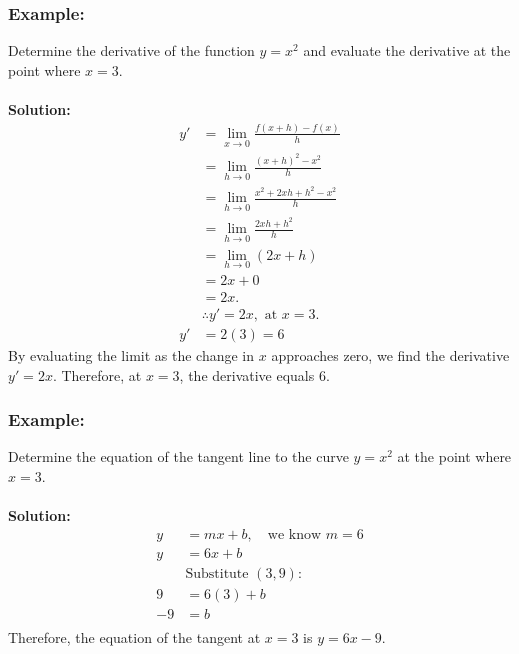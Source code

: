 \documentclass{article}
\begin{document}
\subsubsection*{Example:}
Determine the derivative of the function $y=x^2$ and evaluate the derivative at the point where $x=3$.\\ \\ 
\textbf{Solution:}
\begin{align*}
    y' &= \lim_{x \to 0} \frac{f(x+h)-f(x)}{h}\\
    &= \lim_{h \to 0} \frac{(x+h)^2-x^2}{h}\\
    &= \lim_{h \to 0} \frac{x^2+2xh+h^2-x^2}{h}\\
    &= \lim_{h \to 0} \frac{2xh+h^2}{h}\\
    &= \lim_{h \to 0} (2x+h)\\
    &= 2x + 0\\
    &= 2x.\\
    & \therefore y'=2x, \text{ at } x=3. \\
    y' &=2(3)=6 
\end{align*}
By evaluating the limit as the change in \( x \) approaches zero, we find the derivative \( y' = 2x \). Therefore, at \( x = 3 \), the derivative equals 6.
\newpage
\subsubsection*{Example:}
Determine the equation of the tangent line to the curve $y=x^2$ at the point where $x=3$. \\ \\ 
\textbf{Solution:}
\begin{align*}
    y &= mx + b, \quad \text{we know } m = 6 \\
    y &= 6x + b \\
    & \text{Substitute }(3, 9): \\
    9 &= 6(3) + b \\
    -9 &= b \\
\end{align*}
Therefore, the equation of the tangent at \(x = 3\) is \(y = 6x - 9\).
\end{document}
